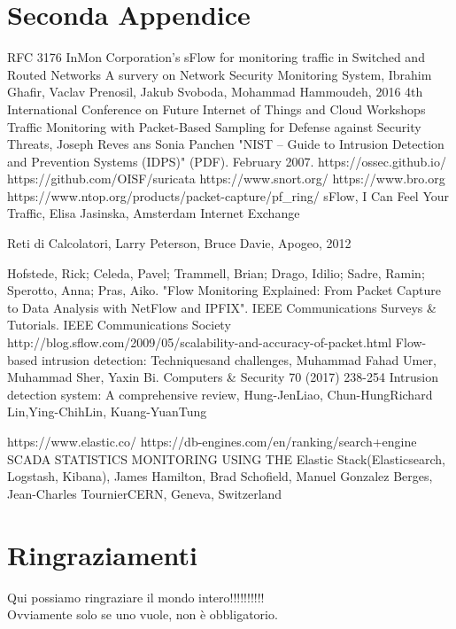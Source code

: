 \documentclass[12pt,a4paper,openright,twoside]{report}
\begin{document}
\chapter{Seconda Appendice}             %
\begin{thebibliography}{90}             %
\rhead[\fancyplain{}{\bfseries \leftmark}]{\fancyplain{}{\bfseries
\thepage}}
 RFC 3176 InMon Corporation's sFlow for monitoring traffic in Switched
and Routed Networks
 A survery on Network Security Monitoring System,
Ibrahim Ghafir, Vaclav Prenosil, Jakub Svoboda, Mohammad Hammoudeh,
 2016 4th International Conference on Future Internet of Things and Cloud Workshops
 Traffic Monitoring with Packet-Based Sampling for Defense against Security Threats, Joseph Reves ans Sonia Panchen
 "NIST – Guide to Intrusion Detection and Prevention Systems (IDPS)" (PDF). February 2007.
 https://ossec.github.io/
 https://github.com/OISF/suricata
 https://www.snort.org/
 https://www.bro.org
 https://www.ntop.org/products/packet-capture/pf\_ring/
 sFlow, I Can Feel Your Traffic, Elisa Jasinska, Amsterdam Internet Exchange


 Reti di Calcolatori, Larry Peterson, Bruce Davie, Apogeo, 2012

 Hofstede, Rick; Celeda, Pavel; Trammell, Brian; Drago, Idilio; Sadre, Ramin; Sperotto, Anna; Pras, Aiko. "Flow Monitoring Explained: From Packet Capture to Data Analysis with NetFlow and IPFIX". IEEE Communications Surveys & Tutorials. IEEE Communications Society
 http://blog.sflow.com/2009/05/scalability-and-accuracy-of-packet.html
 Flow-based intrusion detection: Techniquesand challenges, Muhammad Fahad Umer, Muhammad Sher, Yaxin Bi. Computers \& Security 70 (2017) 238-254
 Intrusion detection system: A comprehensive review, Hung-JenLiao, Chun-HungRichard Lin,Ying-ChihLin, Kuang-YuanTung

 https://www.elastic.co/
 https://db-engines.com/en/ranking/search+engine
 SCADA STATISTICS MONITORING USING THE Elastic Stack(Elasticsearch, Logstash, Kibana), James Hamilton, Brad Schofield, Manuel Gonzalez Berges, Jean-Charles TournierCERN, Geneva, Switzerland
\end{thebibliography}
\clearpage{\pagestyle{empty}\cleardoublepage}
\chapter*{Ringraziamenti}
\thispagestyle{empty}
Qui possiamo ringraziare il mondo intero!!!!!!!!!!\\
Ovviamente solo se uno vuole, non \`e obbligatorio.
\end{document}
